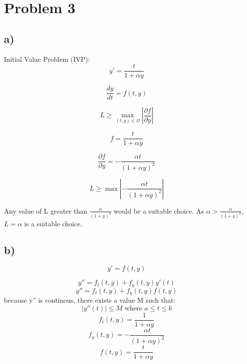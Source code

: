 \documentclass{article}
\begin{document}
\section{Problem 3}
\subsection*{a)}
Initial Value Problem (IVP):
\begin{equation*}
    y'=\frac{t}{1+\alpha y}
\end{equation*}

\begin{equation*}
    \frac{dy}{dt}=f(t,y)
\end{equation*}

\begin{equation*}
    L \geq \max_{(t,y)\in\Omega} \left|\frac{\partial f}{\partial y}\right|
\end{equation*}

\begin{equation*}
    f=\frac{t}{1+\alpha y}
\end{equation*}

\begin{equation*}
    \frac{\partial f}{\partial y}=-\frac{\alpha t}{(1+\alpha y)^2}
\end{equation*}

\begin{equation*}
    L \geq \max \left|-\frac{\alpha t}{(1+\alpha y)^2}\right|
\end{equation*}

Any value of L greater than $\frac{\alpha}{(1+y)^2}$ would be a suitable choice. As $\alpha>\frac{\alpha}{(1+y)^2}$, $L=\alpha$ is a suitable choice.

\subsection*{b)}
\begin{equation*}
    y'=f(t,y)
\end{equation*}

\begin{equation*}
    y''=f_t(t,y)+f_y(t,y)y'(t)
\end{equation*}
\begin{equation*}
    y''=f_t(t,y)+f_y(t,y)f(t,y)
\end{equation*}
because y'' is continous, there exists a value M such that:
\begin{equation*}
    | y''(t)| \leq M \text{ where } a\leq t \leq b
\end{equation*}
\begin{equation*}
    f_t(t,y)=\frac{1}{1+\alpha y}
\end{equation*}
\begin{equation*}
    f_y(t,y)=-\frac{\alpha t}{(1+\alpha y)^2}
\end{equation*}
\begin{equation*}
    f(t,y)=\frac{t}{1+\alpha y}
\end{equation*}
\end{document}
